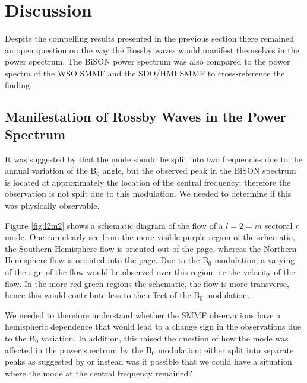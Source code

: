 \section{Discussion}\label{sec:r-mode_discussion}


Despite the compelling results presented in the previous section there remained an open question on the way the Rossby waves would manifest themselves in the power spectrum. The BiSON power spectrum was also compared to the power spectra of the WSO SMMF and the SDO/HMI SMMF to cross-reference the finding.

\subsection{Manifestation of Rossby Waves in the Power Spectrum}

It was suggested by \citet{lanza_sectoral_2019} that the mode should be split into two frequencies due to the annual variation of the B$_0$ angle, but the observed peak in the BiSON spectrum is located at approximately the location of the central frequency; therefore the observation is not split due to this modulation. We needed to determine if this was physically observable.

Figure \ref{fig:l2m2} shows a schematic diagram of the flow of a $l=2=m$ sectoral $r$ mode. One can clearly see from the more visible purple region of the schematic, the Southern Hemisphere flow is oriented out of the page, whereas the Northern Hemisphere flow is oriented into the page. Due to the B$_0$ modulation, a varying of the sign of the flow would be observed over this region, i.e the velocity of the flow. In the more red-green regions the schematic, the flow is more transverse, hence this would contribute less to the effect of the B$_0$ modulation.

We needed to therefore understand whether the SMMF observations have a hemispheric dependence that would lead to a change sign in the observations due to the B$_0$ variation. In addition, this raised the question of how the mode was affected in the power spectrum by the B$_0$ modulation; either split into separate peaks as suggested by \citet{lanza_sectoral_2019} or instead was it possible that we could have a situation where the mode at the central frequency remained?

